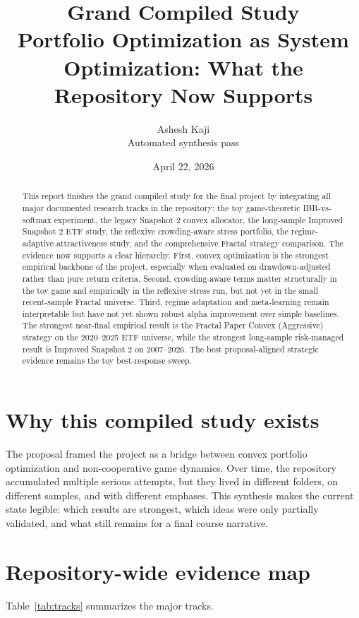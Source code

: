 \documentclass[11pt,a4paper]{article}
\title{\textbf{Grand Compiled Study}\\[0.3em]\large Portfolio Optimization as System Optimization: What the Repository Now Supports}
\author{Ashesh Kaji\\Automated synthesis pass}
\date{April 22, 2026}
\begin{document}
\maketitle

\begin{abstract}
This report finishes the grand compiled study for the final project by integrating all major documented research tracks in the repository: the toy game-theoretic IBR-vs-softmax experiment, the legacy Snapshot 2 convex allocator, the long-sample Improved Snapshot 2 ETF study, the reflexive crowding-aware stress portfolio, the regime-adaptive attractiveness study, and the comprehensive Fractal strategy comparison. The evidence now supports a clear hierarchy. First, convex optimization is the strongest empirical backbone of the project, especially when evaluated on drawdown-adjusted rather than pure return criteria. Second, crowding-aware terms matter structurally in the toy game and empirically in the reflexive stress run, but not yet in the small recent-sample Fractal universe. Third, regime adaptation and meta-learning remain interpretable but have not yet shown robust alpha improvement over simple baselines. The strongest near-final empirical result is the Fractal Paper Convex (Aggressive) strategy on the 2020--2025 ETF universe, while the strongest long-sample risk-managed result is Improved Snapshot 2 on 2007--2026. The best proposal-aligned strategic evidence remains the toy best-response sweep.
\end{abstract}

\section{Why this compiled study exists}
The proposal framed the project as a bridge between convex portfolio optimization and non-cooperative game dynamics. Over time, the repository accumulated multiple serious attempts, but they lived in different folders, on different samples, and with different emphases. This synthesis makes the current state legible: which results are strongest, which ideas were only partially validated, and what still remains for a final course narrative.

\section{Repository-wide evidence map}
Table~\ref{tab:tracks} summarizes the major tracks.
\end{document}
